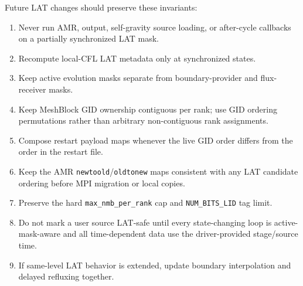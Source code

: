 \documentclass[11pt]{article}
\begin{document}
Future LAT changes should preserve these invariants:
\begin{enumerate}
  \item Never run AMR, output, self-gravity source loading, or after-cycle
        callbacks on a partially synchronized LAT mask.
  \item Recompute local-CFL LAT metadata only at synchronized states.
  \item Keep active evolution masks separate from boundary-provider and
        flux-receiver masks.
  \item Keep MeshBlock GID ownership contiguous per rank; use GID ordering
        permutations rather than arbitrary non-contiguous rank assignments.
  \item Compose restart payload maps whenever the live GID order differs from
        the order in the restart file.
  \item Keep the AMR \texttt{newtoold}/\texttt{oldtonew} maps consistent with
        any LAT candidate ordering before MPI migration or local copies.
  \item Preserve the hard \texttt{max\_nmb\_per\_rank} cap and
        \texttt{NUM\_BITS\_LID} tag limit.
  \item Do not mark a user source LAT-safe until every state-changing loop is
        active-mask-aware and all time-dependent data use the driver-provided
        stage/source time.
  \item If same-level LAT behavior is extended, update boundary interpolation
        and delayed refluxing together.
\end{enumerate}
\end{document}
